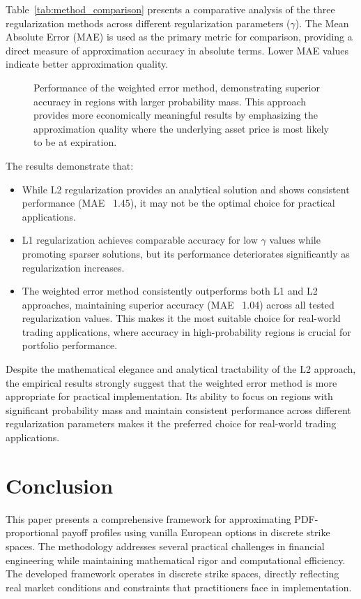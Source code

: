 \documentclass[12pt]{article}
\begin{document}


Table~\ref{tab:method_comparison} presents a comparative analysis of the three regularization 
methods across different regularization parameters ($\gamma$). The Mean Absolute Error (MAE) 
is used as the primary metric for comparison, providing a direct measure of approximation accuracy 
in absolute terms. Lower MAE values indicate better approximation quality.

\begin{figure}[htbp]
\centering

\caption{Performance of the weighted error method, demonstrating superior accuracy in regions 
with larger probability mass. This approach provides more economically meaningful results by 
emphasizing the approximation quality where the underlying asset price is most likely to be 
at expiration.}
\label{fig:weighted}
\end{figure}

\vspace{1em}
The results demonstrate that:
\begin{itemize}
    \item While L2 regularization provides an analytical solution and shows consistent performance 
    (MAE ~1.45), it may not be the optimal choice for practical applications.
    \item L1 regularization achieves comparable accuracy for low $\gamma$ values while promoting 
    sparser solutions, but its performance deteriorates significantly as regularization increases.
    \item The weighted error method consistently outperforms both L1 and L2 approaches, maintaining 
    superior accuracy (MAE ~1.04) across all tested regularization values. This makes it the most 
    suitable choice for real-world trading applications, where accuracy in high-probability regions 
    is crucial for portfolio performance.
\end{itemize}

Despite the mathematical elegance and analytical tractability of the L2 approach, the empirical 
results strongly suggest that the weighted error method is more appropriate for practical 
implementation. Its ability to focus on regions with significant probability mass and maintain 
consistent performance across different regularization parameters makes it the preferred choice for 
real-world trading applications.

\section{Conclusion}
This paper presents a comprehensive framework for approximating PDF-proportional payoff profiles 
using vanilla European options in discrete strike spaces. The methodology addresses several 
practical challenges in financial engineering while maintaining mathematical rigor and 
computational efficiency. The developed framework operates in discrete strike spaces, directly 
reflecting real market conditions and constraints that practitioners face in implementation.
\end{document}

